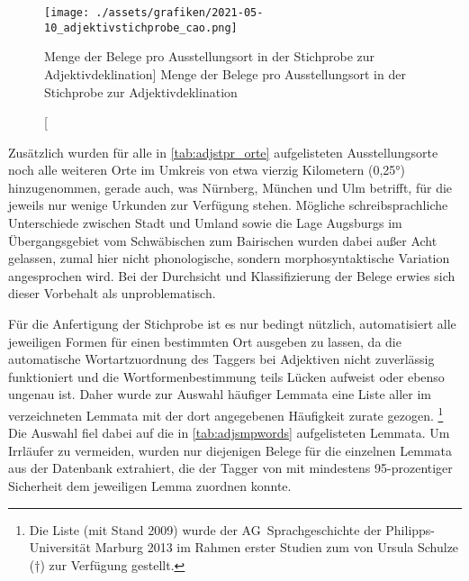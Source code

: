 \begin{figure}
\centering
\texttt{[image: ./assets/grafiken/2021-05-10\_adjektivstichprobe\_cao.png]}
\caption%
	[Menge der Belege pro Ausstellungs\-ort in der Stichprobe zur
		Adjektivdeklination]%
	{Menge der Belege pro Ausstellungs\-ort in der Stichprobe zur
		Adjektivdeklination\nocite{wiesinger1983:rede}}
\label{fig:adjstpr_orte}
\end{figure}

Zusätzlich wurden für alle in \cref{tab:adjstpr_orte} aufgelisteten
Ausstellungs\-orte noch alle weiteren Orte im Umkreis von etwa vierzig
Kilometern (0,25°) hinzugenommen, gerade auch, was Nürnberg, München und Ulm
betrifft, für die jeweils nur wenige Urkunden zur Verfügung stehen. Mögliche
schreibsprachliche Unterschiede zwischen Stadt und Umland sowie die Lage
Augsburgs im Übergangsgebiet vom Schwäbischen zum Bairischen wurden dabei außer
Acht gelassen, zumal hier nicht phonologische, sondern morphosyntaktische
Variation angesprochen wird. Bei der Durchsicht und Klassifizierung der Belege
erwies sich dieser Vorbehalt als unproblematisch.

Für die Anfertigung der Stichprobe ist es nur bedingt nützlich, automatisiert
alle jeweiligen Formen für einen bestimmten Ort ausgeben zu lassen, da die
automatische Wortartzuordnung des Taggers bei Adjektiven nicht zuverlässig
funktioniert und die Wortformenbestimmung teils Lücken aufweist oder ebenso
ungenau ist. Daher wurde zur Auswahl häufiger Lemmata eine Liste aller im
\citet{wmu} verzeichneten Lemmata mit der dort angegebenen Häufigkeit zurate
gezogen.%
%
	\footnote{Die Liste (mit Stand 2009) wurde der AG~Sprachgeschichte der
	Philipps-Universität Marburg 2013 im Rahmen erster Studien zum
	\CAO{} von Ursula Schulze (†) zur Verfügung gestellt.}
%
Die Auswahl fiel dabei auf die in \cref{tab:adjsmpwords} aufgelisteten Lemmata.
Um Irrläufer zu vermeiden, wurden nur diejenigen Belege für die einzelnen
Lemmata aus der Datenbank extrahiert, die der Tagger von \citet{schmid2019} mit
mindestens 95-prozentiger Sicherheit dem jeweiligen Lemma zuordnen konnte.

